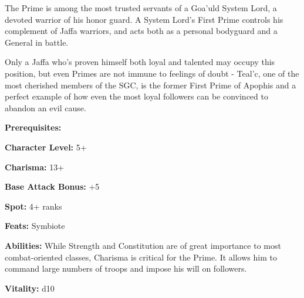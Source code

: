\begin{multicols}{2}

The Prime is among the most trusted servants of a Goa'uld System Lord, a devoted warrior of his honor guard. A System Lord's First Prime controls his complement of Jaffa warriors, and acts both as a personal bodyguard and a General in battle.

Only a Jaffa who's proven himself both loyal and talented may occupy this position, but even Primes are not immune to feelings of doubt - Teal'c, one of the most cherished members of the SGC, is the former First Prime of Apophis and a perfect example of how even the most loyal followers can be convinced to abandon an evil cause.

\columnbreak

\textbf{Prerequisites:} 
\begin{description*}
\item[\hspace{1.5cm}\textbf{Character Level:}] 5+
\item[\hspace{1.5cm}\textbf{Charisma:}] 13+
\item[\hspace{1.5cm}\textbf{Base Attack Bonus:}] +5
\item[\hspace{1.5cm}\textbf{Spot:}] 4+ ranks
\item[\hspace{1.5cm}\textbf{Feats:}] Symbiote
\end{description*}

\textbf{Abilities:} While Strength and Constitution are of great importance to most combat-oriented classes, Charisma is critical for the Prime. It allows him to command large numbers of troops and impose his will on followers.

\textbf{Vitality:} d10

\end{multicols}


